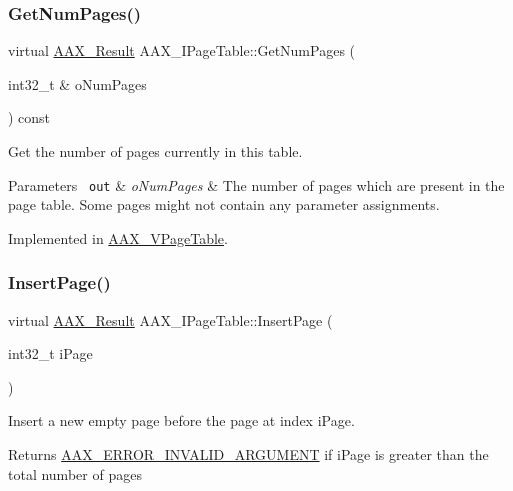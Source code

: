 \subsubsection{\texorpdfstring{GetNumPages()}{GetNumPages()}}
{\footnotesize\ttfamily virtual \mbox{\hyperlink{a00392_a4d8f69a697df7f70c3a8e9b8ee130d2f}{A\+A\+X\+\_\+\+Result}} A\+A\+X\+\_\+\+I\+Page\+Table\+::\+Get\+Num\+Pages (\begin{DoxyParamCaption}\item[{int32\+\_\+t \&}]{o\+Num\+Pages }\end{DoxyParamCaption}) const\hspace{0.3cm}{\ttfamily [pure virtual]}}



Get the number of pages currently in this table. 


\begin{DoxyParams}[1]{Parameters}
\mbox{\texttt{ out}}  & {\em o\+Num\+Pages} & The number of pages which are present in the page table. Some pages might not contain any parameter assignments. \\
\hline
\end{DoxyParams}


Implemented in \mbox{\hyperlink{a01929_ae4f7ce9fd77ff4c7e1e079860c901200}{A\+A\+X\+\_\+\+V\+Page\+Table}}.

\mbox{\label{a01849_a95b7b4d99253e26dd46d2deb4cf96bf8}} 
\subsubsection{\texorpdfstring{InsertPage()}{InsertPage()}}
{\footnotesize\ttfamily virtual \mbox{\hyperlink{a00392_a4d8f69a697df7f70c3a8e9b8ee130d2f}{A\+A\+X\+\_\+\+Result}} A\+A\+X\+\_\+\+I\+Page\+Table\+::\+Insert\+Page (\begin{DoxyParamCaption}\item[{int32\+\_\+t}]{i\+Page }\end{DoxyParamCaption})\hspace{0.3cm}{\ttfamily [pure virtual]}}



Insert a new empty page before the page at index {\ttfamily i\+Page}. 

\begin{DoxyReturn}{Returns}
\mbox{\hyperlink{a00494_a5f8c7439f3a706c4f8315a9609811937a7d27a3bd88231e331c98d85f5b10e2eb}{A\+A\+X\+\_\+\+E\+R\+R\+O\+R\+\_\+\+I\+N\+V\+A\+L\+I\+D\+\_\+\+A\+R\+G\+U\+M\+E\+NT}} if {\ttfamily i\+Page} is greater than the total number of pages
\end{DoxyReturn}

